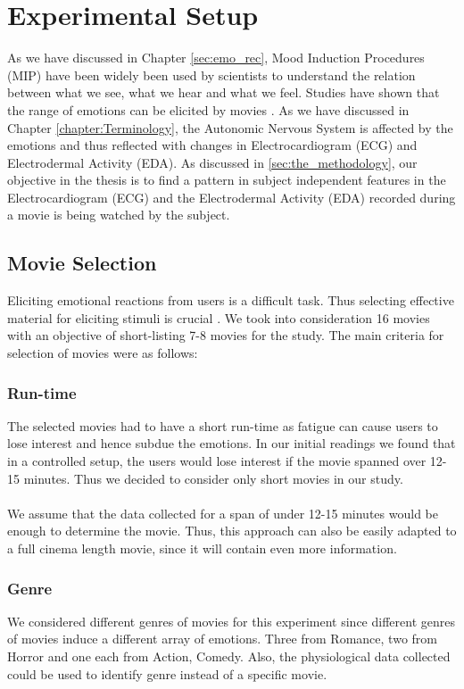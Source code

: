 \section{Experimental Setup}
As we have discussed in Chapter \ref{sec:emo_rec}, Mood Induction Procedures (MIP) have been widely been used by scientists to understand the relation between what we see, what we hear and what we feel. Studies have shown that the range of emotions can be elicited by movies \cite{gross_emotion_1995}. As we have discussed in Chapter \ref{chapter:Terminology}, the Autonomic Nervous System is affected by the emotions and thus reflected with changes in Electrocardiogram (ECG) and Electrodermal Activity (EDA). As discussed in \ref{sec:the_methodology}, our objective in the thesis is to find a pattern in subject independent features in the Electrocardiogram (ECG) and the Electrodermal Activity (EDA) recorded during a movie is being watched by the subject.

\subsection{Movie Selection} Eliciting emotional reactions from users is a difficult task. Thus selecting effective material for eliciting stimuli is crucial \cite{koelstra_deap:_2012}. We took into consideration 16 movies with an objective of short-listing 7-8 movies for the study. The main criteria for selection of movies were as follows:

\subsubsection{Run-time} The selected movies had to have a short run-time as fatigue can cause users to lose interest and hence subdue the emotions. In our initial readings we found that in a controlled setup, the users would lose interest if the movie spanned over 12-15 minutes. Thus we decided to consider only short movies in our study.
\paragraph{} We assume that the data collected for a span of under 12-15 minutes would be enough to determine the movie. Thus, this approach can also be easily adapted to a full cinema length movie, since it will contain even more information. 

\subsubsection{Genre} We considered different genres of movies for this experiment since different genres of movies induce a different array of emotions. Three from Romance, two from Horror and one each from Action, Comedy. Also, the physiological data collected could be used to identify genre instead of a specific movie.

